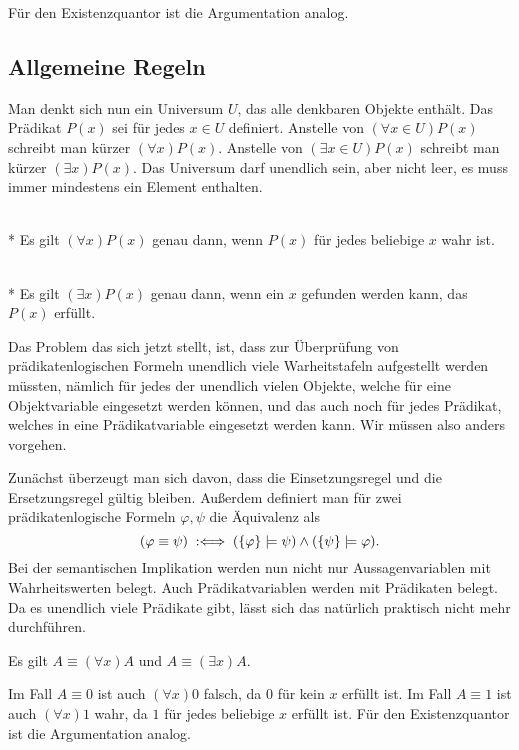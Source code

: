 Für den Existenzquantor ist die Argumentation analog.\;\qedsymbol

\subsection{Allgemeine Regeln}

Man denkt sich nun ein Universum $U$, das alle denkbaren Objekte
enthält. Das Prädikat $P(x)$ sei für jedes $x\in U$ definiert.
Anstelle von $(\forall x\in U)P(x)$ schreibt man kürzer
$(\forall x)P(x)$. Anstelle von $(\exists x\in U)P(x)$ schreibt
man kürzer $(\exists x)P(x)$. Das Universum darf unendlich sein,
aber nicht leer, es muss immer mindestens ein Element enthalten.
\begin{Definition}[Allquantor]\mbox{}\\*
Es gilt $(\forall x)P(x)$ genau dann, wenn $P(x)$ für jedes
beliebige $x$ wahr ist.
\end{Definition}
\begin{Definition}[Existenzquantor]\mbox{}\\*
Es gilt $(\exists x)P(x)$ genau dann, wenn ein $x$ gefunden
werden kann, das $P(x)$ erfüllt.
\end{Definition}
Das Problem das sich jetzt stellt, ist, dass zur Überprüfung
von prädikatenlogischen Formeln unendlich viele Warheitstafeln
aufgestellt werden müssten, nämlich für jedes der unendlich vielen
Objekte, welche für eine Objektvariable eingesetzt werden können, und das
auch noch für jedes Prädikat, welches in eine Prädikatvariable
eingesetzt werden kann. Wir müssen also anders vorgehen.

Zunächst überzeugt man sich davon, dass die Einsetzungsregel und die
Ersetzungsregel gültig bleiben. Außerdem definiert man für zwei
prädikatenlogische Formeln $\varphi,\psi$ die Äquivalenz als
\[(\varphi\equiv\psi)\;:\Longleftrightarrow\; (\{\varphi\}\models\psi)\land (\{\psi\}\models\varphi).\]
Bei der semantischen Implikation werden nun nicht nur Aussagenvariablen mit
Wahrheitswerten belegt. Auch Prädikatvariablen werden mit Prädikaten
belegt. Da es unendlich viele Prädikate gibt, lässt sich das natürlich
praktisch nicht mehr durchführen.
\begin{Satz}
Es gilt $A\equiv (\forall x)A$ und $A\equiv(\exists x)A$.
\end{Satz}
 Im Fall $A\equiv 0$ ist auch
$(\forall x)0$ falsch, da $0$ für kein $x$ erfüllt ist.
Im Fall $A\equiv 1$ ist auch $(\forall x)1$ wahr, da $1$ für jedes
beliebige $x$ erfüllt ist. Für den Existenzquantor ist die
Argumentation analog.\;\qedsymbol

